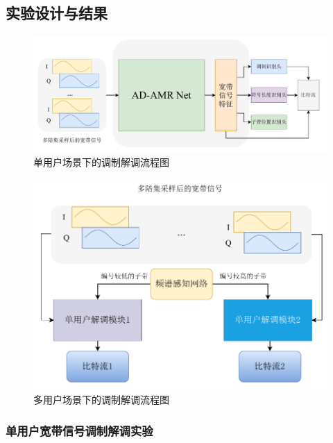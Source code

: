 \subsection{实验设计与结果}

\begin{figure}
    \centering
    \includegraphics[width=\textwidth]{Image/adamr-wideband_demodulate.pdf}
    \caption{单用户场景下的调制解调流程图}\label{fig:demode_single}
\end{figure}
\begin{figure}
    \centering
    \includegraphics[width=\textwidth]{Image/adamr-wideband_demodulate_mul.pdf}
    \caption{多用户场景下的调制解调流程图}\label{fig:demode_multiple}
\end{figure}

\subsubsection{单用户宽带信号调制解调实验}

